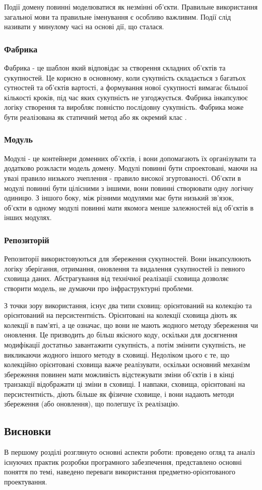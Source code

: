 Події домену повинні моделюватися як незмінні об'єкти.
Правильне використання загальної мови та правильне іменування
є особливо важливим. Події слід називати у минулому часі на основі дії, що сталася.

\subsubsection{Фабрика}
Фабрика - це шаблон який відповідає за створення складних об'єктів та сукупностей.
Це корисно в основному, коли сукупність складається з багатьох 
сутностей та об'єктів вартості, а формування нової сукупності
вимагає більшої кількості кроків, під час яких сукупність не узгоджується.
Фабрика інкапсулює логіку створення та виробляє повністю послідовну сукупність.
Фабрика може бути реалізована як статичний метод або як окремий клас \cite{patterns-gamma}.

\subsubsection{Модуль}
Модулі - це контейнери доменних об'єктів, і вони допомагають їх
організувати та додатково розкласти модель домену.
Модулі повинні бути спроектовані, маючи на увазі правило низького
зчеплення - правило високої згуртованості. Об'єкти в модулі 
повинні бути цілісними з іншими, вони повинні створювати одну логічну одиницю.
З іншого боку, між різними модулями має бути низький зв'язок,
об'єкти в одному модулі повинні мати якомога менше залежностей
від об'єктів в інших модулях.

\subsubsection{Репозиторій}
Репозиторії використовуються для збереження сукупностей.
Вони інкапсулюють логіку зберігання, отримання, оновлення та
видалення сукупностей із певного сховища даних.
Абстрагування від технічної реалізації сховища дозволяє створити модель,
не думаючи про інфраструктурні проблеми.

З точки зору використання, існує два типи сховищ: орієнтований на колекцію
та орієнтований на персистентність. Орієнтовані на колекції
сховища діють як колекції в пам'яті, а це означає,
що вони не мають жодного методу збереження чи оновлення.
Це призводить до більш якісного коду, оскільки для досягнення
модифікації достатньо завантажити сукупність, а потім змінити сукупність,
не викликаючи жодного іншого методу в сховищі. Недоліком цього є те,
що колекційно орієнтовані сховища важче реалізувати, оскільки основний механізм
збереження повинен мати можливість відстежувати зміни об’єктів
і в кінці транзакції відображати ці зміни в сховищі. І навпаки,
сховища, орієнтовані на персистентність, діють більше як фізичне сховище,
і вони надають методи збереження (або оновлення), що полегшує їх реалізацію.

\subsection{Висновки}
В першому розділі розглянуто основні аспекти роботи: проведено огляд
та аналіз існуючих практик розробки програмного забезпечення,
представлено основні поняття по темі, наведено переваги використання
предметно-орієнтованого проектування.
